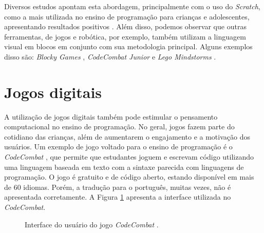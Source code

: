 Diversos estudos apontam esta abordagem, principalmente com o uso do \textit{Scratch}, como a mais utilizada no ensino de programação para crianças e adolescentes, apresentando resultados positivos \citep[e.g.][]{blatt2017mapeamento,bordini2016computaccao,khouri2020mapeamento,werlich2018pensamento}. Além disso, podemos observar que outras ferramentas, de jogos e robótica, por exemplo, também utilizam a linguagem visual em blocos em conjunto com sua metodologia principal. Alguns exemplos disso são: \textit{Blocky Games} \citep{blocklygames2024}, \textit{CodeCombat Junior} \citep{codecombat2024} e \textit{Lego Mindstorms} \citep{legomindstorms2024}.


\section{Jogos digitais}

A utilização de jogos digitais também pode estimular o pensamento computacional no ensino de programação. No geral, jogos fazem parte do cotidiano das crianças, além de aumentarem o engajamento e a motivação dos usuários. Um exemplo de jogo voltado para o ensino de programação é o \textit{CodeCombat} \citep{codecombat2024}, que permite que estudantes joguem e escrevam código utilizando uma linguagem baseada em texto com a sintaxe parecida com linguagens de programação. O jogo é gratuito e de código aberto, estando disponível em mais de 60 idiomas. Porém, a tradução para o português, muitas vezes, não é apresentada corretamente. A Figura \ref{figure:code_combate} apresenta a interface utilizada no \textit{CodeCombat}.

\begin{figure}[h!]
    \centering
    \setlength{\fboxrule}{0.1pt} %
    \caption{Interface do usuário do jogo \textit{CodeCombat} \citep{codecombat2024}.}
    \label{figure:code_combate}
\end{figure}

